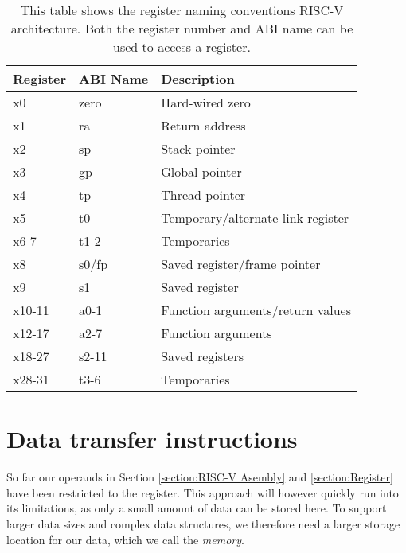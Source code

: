      \begin{table}[h!]
         \centering
         \begin{tabular}{|l|l|l|}
         	\hline
         	Register & ABI Name & Description                       \\ \hline
         	x0       & zero     & Hard-wired zero                   \\
         	x1       & ra       & Return address                    \\
         	x2       & sp       & Stack pointer                     \\
         	x3       & gp       & Global pointer                    \\
         	x4       & tp       & Thread pointer                    \\
         	x5       & t0       & Temporary/alternate link register \\
         	x6-7     & t1-2     & Temporaries                       \\
         	x8       & s0/fp    & Saved register/frame pointer      \\
         	x9       & s1       & Saved register                    \\
         	x10-11   & a0-1     & Function arguments/return values  \\
         	x12-17   & a2-7     & Function arguments                \\
         	x18-27   & s2-11    & Saved registers                   \\
         	x28-31   & t3-6     & Temporaries                       \\ \hline
         \end{tabular}
         \caption{This table shows the register naming conventions RISC-V architecture. Both the register number and ABI name can be used to access a register.}
         \label{table:RISCVRegister}
     \end{table} 
        
    
\section{Data transfer instructions}\label{section:datatranserinstructions}
    So far our operands in Section \ref{section:RISC-V Asembly} and \ref{section:Register} have been restricted to the register. This approach will however quickly run into its limitations, as only a small amount of data can be stored here. To support larger data sizes and complex data structures, we therefore need a larger storage location for our data, which we call the \textit{memory}.
    
